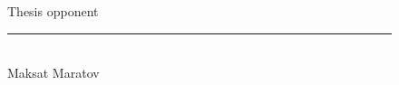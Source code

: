 \begin{titlepage}
\begin{centering}
	\end{centering}
    
    

		\begin{figure}[ht]
			\begin{minipage}[t]{0.5\linewidth}
				Thesis opponent\\


				\rule{13em}{0.4pt}\\
				Maksat Maratov\\
			\end{minipage}
		\end{figure}
		
	\end{titlepage}